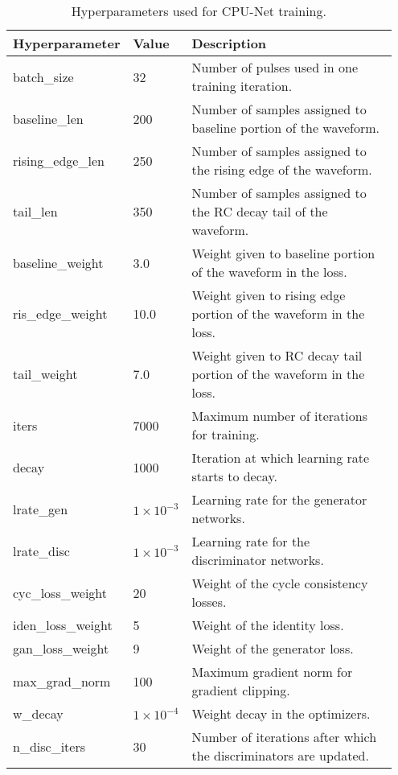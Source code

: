 \begin{table}%
\centering
\renewcommand{\arraystretch}{1.5} %
\setlength{\tabcolsep}{2pt} %
\begin{tabular}{|p{0.18\linewidth}|p{0.12\linewidth}|p{0.65\linewidth}|}
\hline
\textbf{Hyperparameter}       & \textbf{Value} & \textbf{Description} \\ \hline
batch\_size          & 32             & Number of pulses used in one training iteration. \\ \hline
baseline\_len        & 200            & Number of samples assigned to baseline portion of the waveform. \\ \hline
rising\_edge\_len    & 250            & Number of samples assigned to the rising edge of the waveform. \\ \hline
tail\_len            & 350            & Number of samples assigned to the RC decay tail of the waveform. \\ \hline
baseline\_weight     & 3.0            & Weight given to baseline portion of the waveform in the loss. \\ \hline
ris\_edge\_weight    & 10.0           & Weight given to rising edge portion of the waveform in the loss. \\ \hline
tail\_weight         & 7.0            & Weight given to RC decay tail portion of the waveform in the loss. \\ \hline
iters                & 7000           & Maximum number of iterations for training. \\ \hline
decay                & 1000           & Iteration at which learning rate starts to decay. \\ \hline
lrate\_gen           & $1 \times 10^{-3}$ & Learning rate for the generator networks. \\ \hline
lrate\_disc          & $1 \times 10^{-3}$ & Learning rate for the discriminator networks. \\ \hline
cyc\_loss\_weight    & 20             & Weight of the cycle consistency losses.  \\ \hline
iden\_loss\_weight   & 5              & Weight of the identity loss. \\ \hline
gan\_loss\_weight    & 9              & Weight of the generator loss. \\ \hline
max\_grad\_norm      & 100            & Maximum gradient norm for gradient clipping. \\ \hline
w\_decay             & $1 \times 10^{-4}$ & Weight decay in the optimizers. \\ \hline
n\_disc\_iters       & 30             & Number of iterations after which the discriminators are updated. \\ \hline
\end{tabular}
\caption{Hyperparameters used for CPU-Net training.}
\label{tab:hyperparameters}
\end{table}
